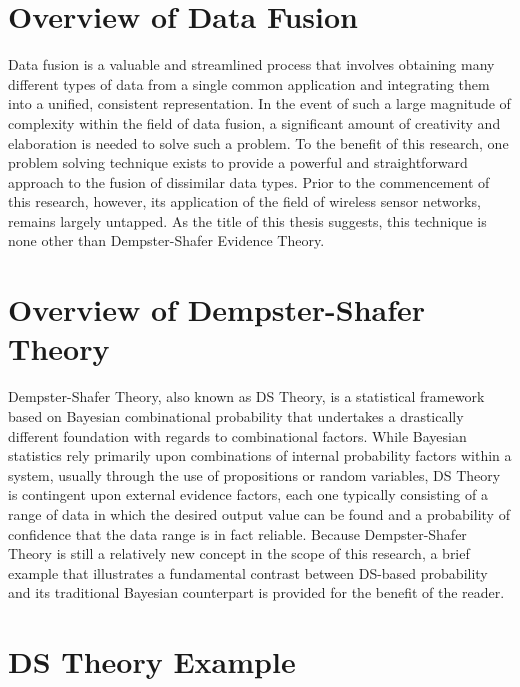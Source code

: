 \documentclass[12pt]{uthesis-v12}  %
\begin{document}
\section{Overview of Data Fusion}

Data fusion is a valuable and streamlined process that involves obtaining many different types of data from a single common application and integrating them into a unified, consistent representation. In the event of such a large magnitude of complexity within the field of data fusion, a significant amount of creativity and elaboration is needed to solve such a problem. To the benefit of this research, one problem solving technique exists to provide a powerful and straightforward approach to the fusion of dissimilar data types. Prior to the commencement of this research, however, its application of the field of wireless sensor networks,  remains largely untapped. As the title of this thesis suggests, this technique is none other than Dempster-Shafer Evidence Theory.

\section{Overview of Dempster-Shafer Theory}

Dempster-Shafer Theory, also known as DS Theory, is a statistical framework based on Bayesian combinational probability that undertakes a drastically different foundation with regards to combinational factors. While Bayesian statistics rely primarily upon combinations of internal probability factors within a system, usually through the use of propositions or random variables, DS Theory is contingent upon external evidence factors, each one typically consisting of a range of data in which the desired output value can be found and a probability of confidence that the data range is in fact reliable. Because Dempster-Shafer Theory is still a relatively new concept in the scope of this research, a brief example that illustrates a fundamental contrast between DS-based probability and its traditional Bayesian counterpart is provided for the benefit of the reader.

\section{DS Theory Example}
\end{document}
